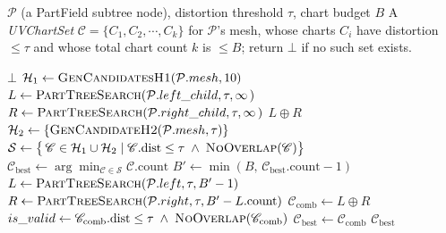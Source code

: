 \begin{algorithm}[t]
\caption{\textsc{PartTreeSearch}}
\label{alg:search}
\begin{algorithmic}[1]
\Require $\mathcal{P}$ (a PartField subtree node), distortion threshold $\tau$, chart budget $B$
\Ensure A \emph{UVChartSet} $\mathscr{C}=\{C_1, C_2, \cdots, C_k\}$ for $\mathcal{P}$'s mesh, whose charts $C_i$ have distortion $\le \tau$ and whose total chart count $k$ is $\le B$; return $\bot$ if no such set exists.

\vspace{2pt}

                              
        \State \Return $\bot$
    \EndIf
    \State $\mathcal{H}_1 \gets \Call{GenCandidatesH1}{\mathcal{P}.mesh,10}$  \label{line:heuristic1}
     
        \State {}   
    \EndFor
                
        \State $L \gets \Call{PartTreeSearch}{\mathcal{P}.left\_child ,\tau, \infty\,}$
        \State $R \gets \Call{PartTreeSearch}{\mathcal{P}.right\_child ,\tau, \infty\,}$
        \State \Return $L \oplus R$ 
    \Else
    \State $\mathcal{H}_2 \gets \{\Call{GenCandidateH2}{\mathcal{P}.mesh,\tau}\}$  \label{line:heuristic2}
    \State {} 
    \State $\mathcal{S} \gets \bigl\{\,\mathscr{C}\in \mathcal{H}_1 \cup \mathcal{H}_2 \mid
            \mathscr{C}.\text{dist}\le\tau \;\land\; \Call{NoOverlap}{\mathscr{C}}\bigr\}$
    \State $\mathscr{C}_{\text{best}} \gets \arg\!\min_{\mathscr{C} \in \mathcal{S}} \mathscr{C}.\text{count}$
    \State {}     \label{line:recursion}
    \State $B' \gets \min(B,\,\mathscr{C}_{\text{best}}.\text{count}-1)$ 
    \State $L \gets \Call{PartTreeSearch}{\mathcal{P}.left ,\tau,B'-1}$
    \State $R \gets \Call{PartTreeSearch}{\mathcal{P}.right,\tau,B'-L.\text{count}}$
    \State $\mathscr{C}_{\text{comb}} \gets L \oplus R$
    \State $is\_valid \gets \mathscr{C}_{\text{comb}}.\text{dist}\le\tau \;\land\; \Call{NoOverlap}{\mathscr{C}_{\text{comb}}}$
        \State $\mathscr{C}_{\text{best}}\gets \mathscr{C}_{\text{comb}}$
    \EndIf
    \State \Return $\mathscr{C}_{\text{best}}$
    \EndIf

\EndProcedure
\end{algorithmic}

\end{algorithm}
